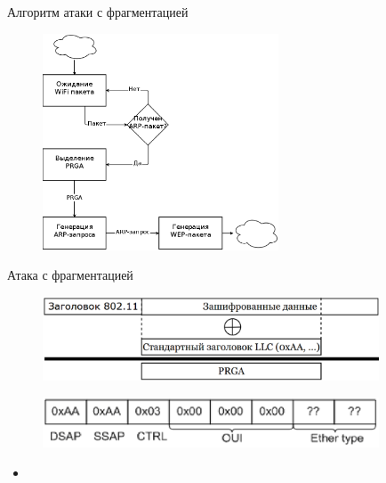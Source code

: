 \documentclass[12pt]{beamer}
\begin{document}
\begin{frame}{Алгоритм атаки с фрагментацией}

\begin{figure}
    \includegraphics[width=7cm]{graphics/fragment_program_algo.eps}
\end{figure}

\end{frame} 


\begin{frame}{Атака с фрагментацией}

\begin{figure}
    \includegraphics[width=10cm]{graphics/restore_part_of_gamma.eps}
\end{figure}

\begin{figure}
    \includegraphics[width=10cm]{graphics/default_llc_header.eps}
\end{figure}

\end{frame} 


\begin{frame}{}

\begin{itemize}
    \item
\end{itemize}

\end{frame} 
\end{document}
